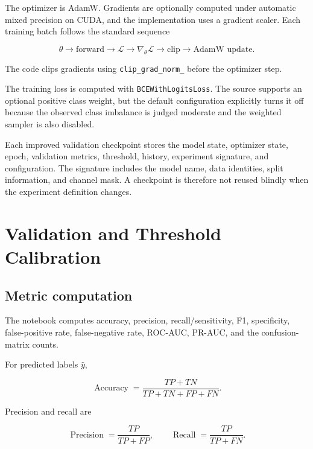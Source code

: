 \documentclass[11pt,a4paper]{article}
\newcommand{\code}[1]{\texttt{#1}}
\begin{document}
The optimizer is AdamW. Gradients are optionally computed under automatic mixed precision on CUDA, and the implementation uses a gradient scaler. Each training batch follows the standard sequence

\begin{equation}
\theta
\rightarrow
\text{forward}
\rightarrow
\mathcal{L}
\rightarrow
\nabla_\theta\mathcal{L}
\rightarrow
\text{clip}
\rightarrow
\text{AdamW update}.
\end{equation}

The code clips gradients using \code{clip\_grad\_norm\_} before the optimizer step.

The training loss is computed with \code{BCEWithLogitsLoss}. The source supports an optional positive class weight, but the default configuration explicitly turns it off because the observed class imbalance is judged moderate and the weighted sampler is also disabled.

Each improved validation checkpoint stores the model state, optimizer state, epoch, validation metrics, threshold, history, experiment signature, and configuration. The signature includes the model name, data identities, split information, and channel mask. A checkpoint is therefore not reused blindly when the experiment definition changes.

\section{Validation and Threshold Calibration}

\subsection{Metric computation}

The notebook computes accuracy, precision, recall/sensitivity, F1, specificity, false-positive rate, false-negative rate, ROC-AUC, PR-AUC, and the confusion-matrix counts.

For predicted labels $\hat{y}$,

\begin{equation}
\operatorname{Accuracy}
=
\frac{TP+TN}{TP+TN+FP+FN}.
\end{equation}

Precision and recall are

\begin{equation}
\operatorname{Precision}
=
\frac{TP}{TP+FP},
\qquad
\operatorname{Recall}
=
\frac{TP}{TP+FN}.
\end{equation}
\end{document}
